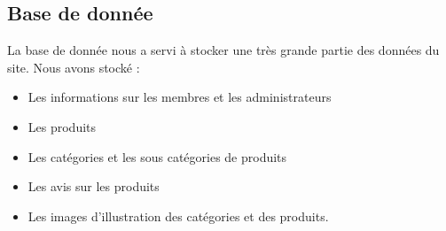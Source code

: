 	\subsection{Base de donnée}
	La base de donnée nous a servi à stocker une très grande partie des données du site. Nous avons stocké :
	\begin{itemize}
	\item Les informations sur les membres et les administrateurs
	\item Les produits
	\item Les catégories et les sous catégories de produits
	\item Les avis sur les produits
	\item Les images d'illustration des catégories et des produits.
	\end{itemize}